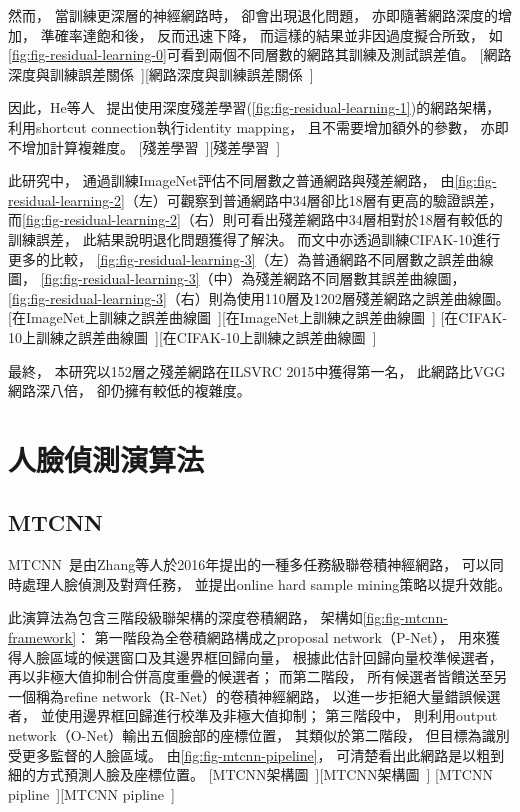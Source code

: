 \documentclass[class=NCU_thesis, crop=false]{standalone}
\begin{document}
然而，
當訓練更深層的神經網路時，
卻會出現退化問題，
亦即隨著網路深度的增加，
準確率達飽和後，
反而迅速下降，
而這樣的結果並非因過度擬合所致，
如\cref{fig:fig-residual-learning-0}可看到兩個不同層數的網路其訓練及測試誤差值。
[網路深度與訓練誤差關係~\cite{he_deep_2016}][網路深度與訓練誤差關係~\cite{he_deep_2016}]

因此，He等人~\cite{he_deep_2016}
提出使用深度殘差學習(\cref{fig:fig-residual-learning-1})的網路架構，
利用shortcut connection執行identity mapping，
且不需要增加額外的參數，
亦即不增加計算複雜度。
[殘差學習~\cite{he_deep_2016}][殘差學習~\cite{he_deep_2016}]

此研究中，
通過訓練ImageNet評估不同層數之普通網路與殘差網路，
由\cref{fig:fig-residual-learning-2}（左）可觀察到普通網路中34層卻比18層有更高的驗證誤差，
而\cref{fig:fig-residual-learning-2}（右）則可看出殘差網路中34層相對於18層有較低的訓練誤差，
此結果說明退化問題獲得了解決。
而文中亦透過訓練CIFAK-10進行更多的比較，
\cref{fig:fig-residual-learning-3}（左）為普通網路不同層數之誤差曲線圖，
\cref{fig:fig-residual-learning-3}（中）為殘差網路不同層數其誤差曲線圖，
\cref{fig:fig-residual-learning-3}（右）則為使用110層及1202層殘差網路之誤差曲線圖。
[在ImageNet上訓練之誤差曲線圖~\cite{he_deep_2016}][在ImageNet上訓練之誤差曲線圖~\cite{he_deep_2016}]
[在CIFAK-10上訓練之誤差曲線圖~\cite{he_deep_2016}][在CIFAK-10上訓練之誤差曲線圖~\cite{he_deep_2016}]

最終，
本研究以152層之殘差網路在ILSVRC 2015中獲得第一名，
此網路比VGG網路深八倍，
卻仍擁有較低的複雜度。

\section{人臉偵測演算法}
\subsection{MTCNN}
MTCNN~\cite{zhang_joint_2016}是由Zhang等人於2016年提出的一種多任務級聯卷積神經網路，
可以同時處理人臉偵測及對齊任務，
並提出online hard sample mining策略以提升效能。

此演算法為包含三階段級聯架構的深度卷積網路，
架構如\cref{fig:fig-mtcnn-framework}：
第一階段為全卷積網路構成之proposal network（P-Net），
用來獲得人臉區域的候選窗口及其邊界框回歸向量，
根據此估計回歸向量校準候選者，
再以非極大值抑制合併高度重疊的候選者；
而第二階段，
所有候選者皆饋送至另一個稱為refine network（R-Net）的卷積神經網路，
以進一步拒絕大量錯誤候選者，
並使用邊界框回歸進行校準及非極大值抑制；
第三階段中，
則利用output network（O-Net）輸出五個臉部的座標位置，
其類似於第二階段，
但目標為識別受更多監督的人臉區域。
由\cref{fig:fig-mtcnn-pipeline}，
可清楚看出此網路是以粗到細的方式預測人臉及座標位置。
[MTCNN架構圖~\cite{zhang_joint_2016}][MTCNN架構圖~\cite{zhang_joint_2016}]
[MTCNN pipline~\cite{zhang_joint_2016}][MTCNN pipline~\cite{zhang_joint_2016}]
\end{document}
